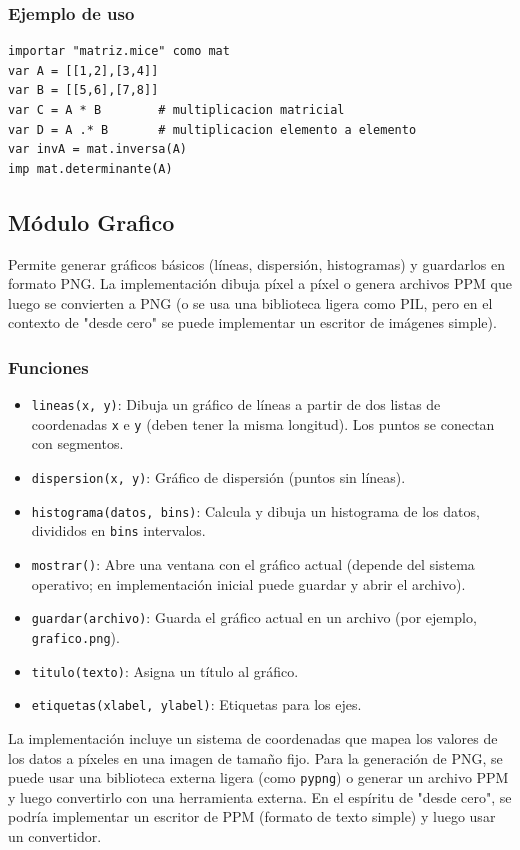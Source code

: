 \documentclass[12pt]{article}
\begin{document}
\subsubsection*{Ejemplo de uso}
\begin{lstlisting}
importar "matriz.mice" como mat
var A = [[1,2],[3,4]]
var B = [[5,6],[7,8]]
var C = A * B        # multiplicacion matricial
var D = A .* B       # multiplicacion elemento a elemento
var invA = mat.inversa(A)
imp mat.determinante(A)
\end{lstlisting}

\subsection{Módulo Grafico}

Permite generar gráficos básicos (líneas, dispersión, histogramas) y guardarlos en formato PNG. La implementación dibuja píxel a píxel o genera archivos PPM que luego se convierten a PNG (o se usa una biblioteca ligera como PIL, pero en el contexto de "desde cero" se puede implementar un escritor de imágenes simple).

\subsubsection*{Funciones}
\begin{itemize}
    \item \texttt{lineas(x, y)}: Dibuja un gráfico de líneas a partir de dos listas de coordenadas \texttt{x} e \texttt{y} (deben tener la misma longitud). Los puntos se conectan con segmentos.
    \item \texttt{dispersion(x, y)}: Gráfico de dispersión (puntos sin líneas).
    \item \texttt{histograma(datos, bins)}: Calcula y dibuja un histograma de los datos, divididos en \texttt{bins} intervalos.
    \item \texttt{mostrar()}: Abre una ventana con el gráfico actual (depende del sistema operativo; en implementación inicial puede guardar y abrir el archivo).
    \item \texttt{guardar(archivo)}: Guarda el gráfico actual en un archivo (por ejemplo, \texttt{grafico.png}).
    \item \texttt{titulo(texto)}: Asigna un título al gráfico.
    \item \texttt{etiquetas(xlabel, ylabel)}: Etiquetas para los ejes.
\end{itemize}

La implementación incluye un sistema de coordenadas que mapea los valores de los datos a píxeles en una imagen de tamaño fijo. Para la generación de PNG, se puede usar una biblioteca externa ligera (como \texttt{pypng}) o generar un archivo PPM y luego convertirlo con una herramienta externa. En el espíritu de "desde cero", se podría implementar un escritor de PPM (formato de texto simple) y luego usar un convertidor.
\end{document}
